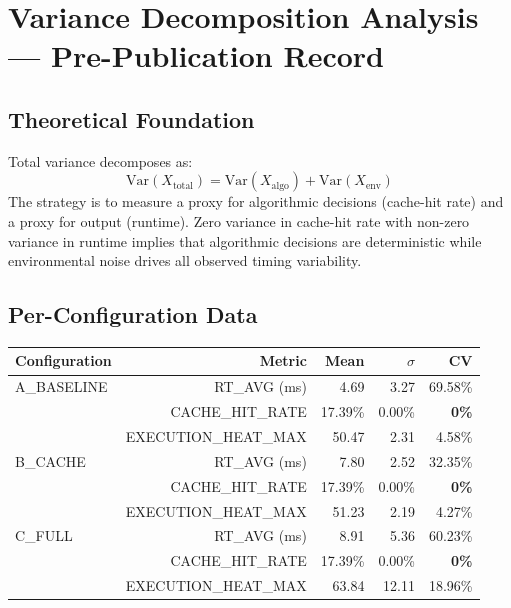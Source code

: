 
\section{Variance Decomposition Analysis --- Pre-Publication Record}

\subsection{Theoretical Foundation}

Total variance decomposes as:
\[
\mathrm{Var}(X_{\text{total}}) = \mathrm{Var}(X_{\text{algo}}) + \mathrm{Var}(X_{\text{env}})
\]
The strategy is to measure a proxy for algorithmic decisions (cache-hit rate) and a proxy
for output (runtime). Zero variance in cache-hit rate with non-zero variance in runtime
implies that algorithmic decisions are deterministic while environmental noise drives all
observed timing variability.

\subsection{Per-Configuration Data}

\begin{center}
\begin{tabular}{lrrrr}
\toprule
Configuration & Metric & Mean & $\sigma$ & CV \\
\midrule
A\_BASELINE & RT\_AVG (ms) & 4.69 & 3.27 & 69.58\% \\
            & CACHE\_HIT\_RATE & 17.39\% & 0.00\% & \textbf{0\%} \\
            & EXECUTION\_HEAT\_MAX & 50.47 & 2.31 & 4.58\% \\
\midrule
B\_CACHE    & RT\_AVG (ms) & 7.80 & 2.52 & 32.35\% \\
            & CACHE\_HIT\_RATE & 17.39\% & 0.00\% & \textbf{0\%} \\
            & EXECUTION\_HEAT\_MAX & 51.23 & 2.19 & 4.27\% \\
\midrule
C\_FULL     & RT\_AVG (ms) & 8.91 & 5.36 & 60.23\% \\
            & CACHE\_HIT\_RATE & 17.39\% & 0.00\% & \textbf{0\%} \\
            & EXECUTION\_HEAT\_MAX & 63.84 & 12.11 & 18.96\% \\
\bottomrule
\end{tabular}
\end{center}

